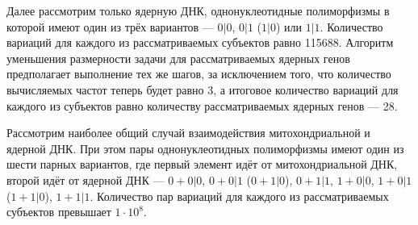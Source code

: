 Далее рассмотрим только ядерную ДНК, однонуклеотидные полиморфизмы в которой имеют один из трёх вариантов --- $0|0$, $0|1$ ($1|0$) или $1|1$. Количество вариаций для каждого из рассматриваемых субъектов равно 115688. Алгоритм уменьшения размерности задачи для рассматриваемых ядерных генов предполагает выполнение тех же шагов, за исключением того, что количество вычисляемых частот теперь будет равно 3, а итоговое количество вариаций для каждого из субъектов равно количеству рассматриваемых ядерных генов --- 28.

Рассмотрим наиболее общий случай взаимодействия митохондриальной и ядерной ДНК. При этом пары однонуклеотидных полиморфизмы имеют один из шести парных вариантов, где первый элемент идёт от митохондриальной ДНК, второй идёт от ядерной ДНК --- $0 + 0|0$, $0 + 0|1$ ($0 + 1|0$), $0 + 1|1$, $1 + 0|0$, $1 + 0|1$ ($1 + 1|0$), $1 + 1|1$. Количество пар вариаций для каждого из рассматриваемых субъектов превышает $1 \cdot 10^{8}$.

